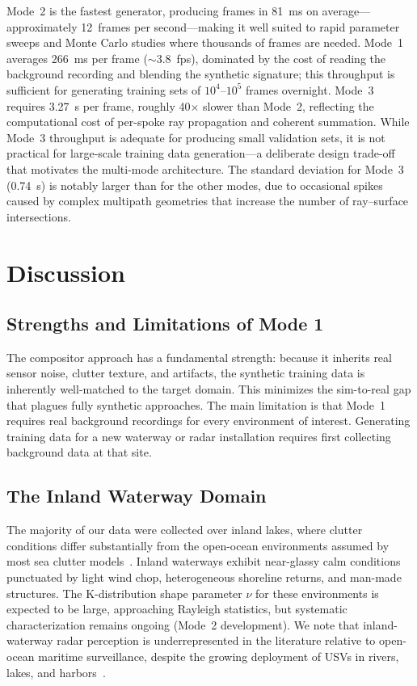 \documentclass[conf]{new-aiaa}
\begin{document}
Mode~2 is the fastest generator, producing frames in \SI{81}{\milli\second} on average---approximately 12~frames per second---making it well suited to rapid parameter sweeps and Monte Carlo studies where thousands of frames are needed. Mode~1 averages \SI{266}{\milli\second} per frame (${\sim}$3.8~fps), dominated by the cost of reading the background recording and blending the synthetic signature; this throughput is sufficient for generating training sets of $10^{4}$--$10^{5}$ frames overnight. Mode~3 requires \SI{3.27}{\second} per frame, roughly 40$\times$ slower than Mode~2, reflecting the computational cost of per-spoke ray propagation and coherent summation. While Mode~3 throughput is adequate for producing small validation sets, it is not practical for large-scale training data generation---a deliberate design trade-off that motivates the multi-mode architecture. The standard deviation for Mode~3 (\SI{0.74}{\second}) is notably larger than for the other modes, due to occasional spikes caused by complex multipath geometries that increase the number of ray--surface intersections.

\section{Discussion}
\label{sec:discussion}

\subsection{Strengths and Limitations of Mode 1}

The compositor approach has a fundamental strength: because it inherits real sensor noise, clutter texture, and artifacts, the synthetic training data is inherently well-matched to the target domain. This minimizes the sim-to-real gap that plagues fully synthetic approaches. The main limitation is that Mode~1 requires real background recordings for every environment of interest. Generating training data for a new waterway or radar installation requires first collecting background data at that site.

\subsection{The Inland Waterway Domain}

The majority of our data were collected over inland lakes, where clutter conditions differ substantially from the open-ocean environments assumed by most sea clutter models~\cite{ward2013sea}. Inland waterways exhibit near-glassy calm conditions punctuated by light wind chop, heterogeneous shoreline returns, and man-made structures. The K-distribution shape parameter $\nu$ for these environments is expected to be large, approaching Rayleigh statistics, but systematic characterization remains ongoing (Mode~2 development). We note that inland-waterway radar perception is underrepresented in the literature relative to open-ocean maritime surveillance, despite the growing deployment of USVs in rivers, lakes, and harbors~\cite{cheng2021robust}.
\end{document}
